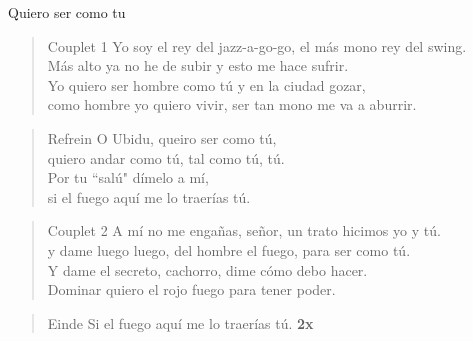 \begin{song}{Quiero ser como tu}


\begin{verse}{Couplet 1}
Yo soy el rey del jazz-a-go-go, el m\'as mono rey del swing.\\
M\'as alto ya no he de subir y esto me hace sufrir.\\
Yo quiero ser hombre como t\'u y en la ciudad gozar,\\
como hombre yo quiero vivir, ser tan mono me va a aburrir. \hspace{3em} \hspace{1em}
\end{verse}

\begin{verse}{Refrein}
O Ubidu, queiro ser como t\'u,\\
quiero andar como t\'u, tal como t\'u, t\'u.\\
Por tu ``sal\'u" d\'imelo a m\'i,\\
si el fuego aqu\'i me lo traer\'ias t\'u.\\
\end{verse}

\begin{verse}{Couplet 2}
A m\'i no me enga\~nas, se\~nor, un trato hicimos yo y t\'u.\\
y dame luego luego, del hombre el fuego, para ser como t\'u.\\
Y dame el secreto, cachorro, dime c\'omo debo hacer.\\
Dominar quiero el rojo fuego para tener poder. \hspace{3em} \hspace{1em}
\end{verse}


\begin{verse}{Einde}
Si el fuego aqu\'i me lo traer\'ias t\'u. \textbf{2x}
\end{verse}
\end{song}

